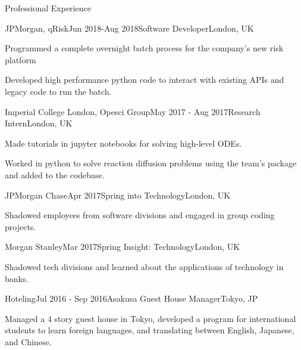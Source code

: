 \documentclass[10pt]{resume} %
\begin{document}
\begin{rSection}{Professional Experience}


\begin{rSubsection}{JPMorgan, qRisk}{Jun 2018-Aug 2018}{Software
Developer}{London, UK}
  \item Programmed a complete overnight batch process for the company's new
risk platform
  \item Developed high performance python code to interact with existing APIs
and legacy code to run the batch.
\end{rSubsection}


\begin{rSubsection}{Imperial College London, Opesci Group}{May 2017 - Aug 2017}{Research Intern}{London, UK}
    \item Made tutorials in jupyter notebooks for solving high-level ODEs.
    \item Worked in python to solve reaction diffusion problems using the team's package and added to the codebase.
\end{rSubsection}


\begin{rSubsection}{JPMorgan Chase}{Apr 2017}{Spring into Technology}{London, UK}
    \item Shadowed employees from software divisions and engaged in group coding projects.
\end{rSubsection}


\begin{rSubsection}{Morgan Stanley}{Mar 2017}{Spring Insight: Technology}{London, UK}
    \item Shadowed tech divisions and learned about the applications of technology in banks.
\end{rSubsection}


\begin{rSubsection}{Hoteling}{Jul 2016 - Sep 2016}{Asakusa Guest House Manager}{Tokyo, JP}
    \item Managed a 4 story guest house in Tokyo, developed a program for international students to learn foreign languages, and translating between English, Japanese, and Chinese.
\end{rSubsection}

\end{rSection}
\end{document}
